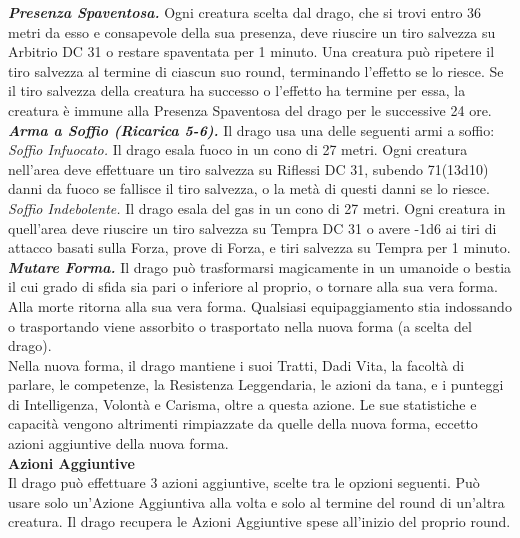 \begin{multicols}{2}
\emph{\textbf{Presenza Spaventosa.}} Ogni creatura scelta dal drago, che si trovi entro 36 metri da esso e consapevole della sua presenza, deve riuscire un tiro salvezza su Arbitrio DC  31 o restare spaventata per 1 minuto. Una creatura può ripetere il tiro salvezza al termine di ciascun suo round, terminando l'effetto se lo riesce. Se il tiro salvezza della creatura ha successo o l'effetto ha termine per essa, la creatura è immune alla Presenza Spaventosa del drago per le successive 24 ore. \\
\emph{\textbf{Arma a Soffio (Ricarica 5-6).}} Il drago usa una delle seguenti armi a soffio:\\
\emph{Soffio Infuocato.} Il drago esala fuoco in un cono di 27 metri. Ogni creatura nell'area deve effettuare un tiro salvezza su Riflessi DC  31, subendo 71(13d10) danni da fuoco se fallisce il tiro salvezza, o la metà di questi danni se lo riesce.\\

\emph{Soffio Indebolente.} Il drago esala del gas in un cono di 27 metri. Ogni creatura in quell'area deve riuscire un tiro salvezza su Tempra DC  31 o avere -1d6 ai tiri di attacco basati sulla Forza, prove di Forza, e tiri salvezza su Tempra per 1 minuto.\\
\emph{\textbf{Mutare Forma.}} Il drago può trasformarsi magicamente in un umanoide o bestia il cui grado di sfida sia pari o inferiore al proprio, o tornare alla sua vera forma. Alla morte ritorna alla sua vera forma. Qualsiasi equipaggiamento stia indossando o trasportando viene assorbito o trasportato nella nuova forma (a scelta del drago).\\
Nella nuova forma, il drago mantiene i suoi Tratti, Dadi Vita, la facoltà di parlare, le competenze, la Resistenza Leggendaria, le azioni da tana, e i punteggi di Intelligenza, Volontà e Carisma, oltre a questa azione. Le sue statistiche e capacità vengono altrimenti rimpiazzate da quelle della nuova forma, eccetto azioni aggiuntive della nuova forma.\\
\textbf{Azioni Aggiuntive}\\
Il drago può effettuare 3 azioni aggiuntive, scelte tra le opzioni seguenti. Può usare solo un'Azione Aggiuntiva alla volta e solo al termine del round di un'altra creatura. Il drago recupera le Azioni Aggiuntive spese all'inizio del proprio round.\\


\end{multicols}
